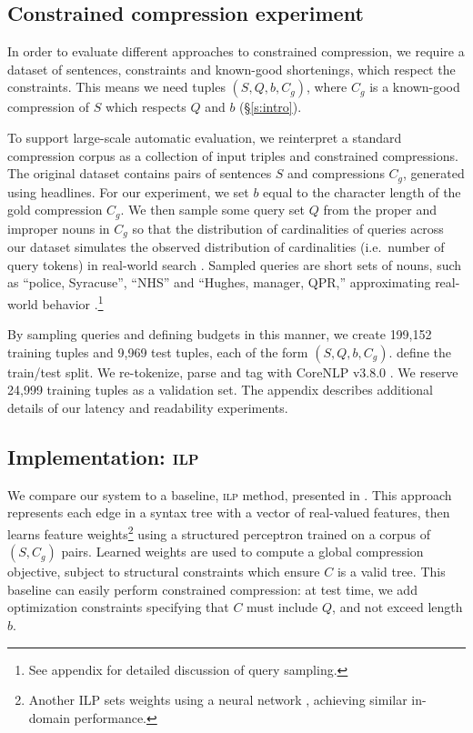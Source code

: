 \documentclass[11pt,a4paper]{article}
\begin{document}
\subsection{Constrained compression experiment}\label{s:constrained}

In order to evaluate different approaches to constrained compression, we require a dataset of sentences, constraints and known-good shortenings, which respect the constraints. This means we need tuples $(S, Q, b, C_g)$, where $C_g$ is a known-good compression of $S$ which respects $Q$ and $b$ (\S\ref{s:intro}).

To support large-scale automatic evaluation, we reinterpret a standard compression corpus \cite{filippova2013overcoming}
as a collection of input triples and constrained compressions. The original dataset contains pairs of sentences $S$ and compressions $C_g$, generated using headlines. For our experiment, we set $b$ equal to the character length of the gold compression $C_g$. We then sample some query set $Q$ from the proper and improper nouns in $C_g$ so that the distribution of cardinalities of queries across our dataset simulates the observed distribution of cardinalities (i.e.\ number of query tokens) in real-world search \cite{Jansen2000RealLR}. Sampled queries are short sets of nouns, such as ``police, Syracuse'', ``NHS'' and ``Hughes, manager, QPR,'' approximating real-world behavior \cite{Barr2008TheLS}.\footnote{See appendix for detailed discussion of query sampling.} 

By sampling queries and defining budgets in this manner, we create {199,152} training tuples and {9,969} test tuples, each of the form $(S,Q,b,C_g)$. \citet{filippova2013overcoming} define the train/test split. We re-tokenize, parse and tag with CoreNLP v3.8.0 \cite{corenlp}. We reserve 24,999 training tuples as a validation set. The appendix describes additional details of our latency and readability experiments.

\subsection{Implementation: \textsc{ilp}}\label{s:ilp}

We compare our system to a baseline, \textsc{ilp} method, presented in \citet{filippova2013overcoming}. This approach represents each edge in a syntax tree with a vector of real-valued features, then learns feature weights\footnote{Another ILP sets weights using a neural network \citet{Wang2017CanSH}, achieving similar in-domain performance.} using a structured perceptron trained on a corpus of $(S,C_g)$ pairs.  Learned weights are used to compute a global compression objective, subject to structural constraints which ensure $C$ is a valid tree. This baseline can easily perform constrained compression: at test time, we add optimization constraints specifying that $C$ must include $Q$, and not exceed length $b$.
\end{document}
